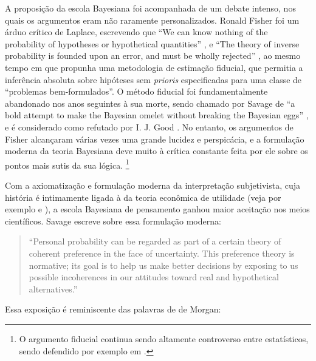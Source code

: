 A proposição da escola Bayesiana foi acompanhada de um debate intenso, nos quais os argumentos eram não raramente personalizados.
Ronald Fisher foi um árduo crítico
de Laplace, escrevendo que ``We can know nothing of the probability of hypotheses or hypothetical quantities'' \citep{Fisher1921},
e ``The theory of inverse probability is founded upon an error, and must be wholly rejected'' \citep{Fisher1925}, ao mesmo tempo
em que propunha uma metodologia de estimação fiducial, 
que permitia a inferência absoluta sobre hipóteses sem {\em prioris} 
especificadas para uma classe de ``problemas bem-formulados''. O método fiducial foi fundamentalmente abandonado nos anos 
seguintes à sua morte, sendo chamado por Savage de ``a bold attempt to make the Bayesian omelet without
breaking the Bayesian eggs'' \citep{Savage60}, e é considerado como refutado por 
I. J. Good \citep{Good92}. No entanto, os argumentos de Fisher
alcançaram várias vezes uma grande lucidez e perspicácia, e a formulação moderna da teoria Bayesiana 
deve muito à crítica constante feita por ele sobre os pontos mais sutis da sua lógica. \footnote{
O argumento fiducial continua sendo altamente controverso entre estatísticos, sendo defendido por exemplo
em \citep{Hacking65}.}

Com a axiomatização e formulação moderna da interpretação subjetivista, cuja história é intimamente ligada à da teoria
econômica de utilidade (veja por exemplo \citep{Friedman48} e \citep{Pfanzagl67}),
a escola Bayesiana de pensamento ganhou maior aceitação nos meios científicos. Savage escreve sobre essa formulação moderna:

\begin{quote}
``Personal probability can be regarded as part of a certain theory of coherent preference in the face of uncertainty. This
preference theory is normative; its goal is to help us make better decisions by exposing to us possible incoherences in our
attitudes toward real and hypothetical alternatives.'' \citep{Savage67}
\end{quote}

Essa exposição é reminiscente das palavras de de Morgan:

